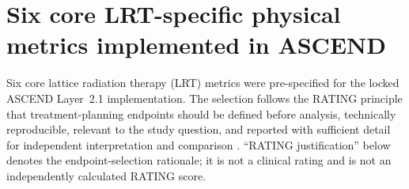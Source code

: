 \documentclass[10pt,a4paper]{article}
\begin{document}
\section*{Six core LRT-specific physical metrics implemented in ASCEND}

Six core lattice radiation therapy (LRT) metrics were pre-specified for the locked ASCEND Layer~2.1 implementation. The selection follows the RATING principle that treatment-planning endpoints should be defined before analysis, technically reproducible, relevant to the study question, and reported with sufficient detail for independent interpretation and comparison \cite{Hansen2020RATING}. ``RATING justification'' below denotes the endpoint-selection rationale; it is not a clinical rating and is not an independently calculated RATING score.

\scriptsize
\end{document}
